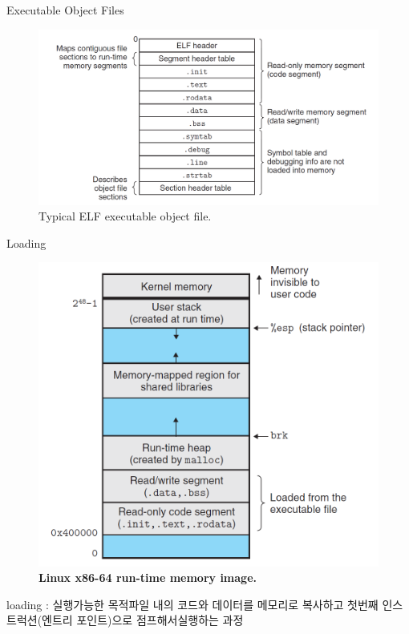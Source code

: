 \documentclass[10pt]{beamer}
\begin{document}
\begin{frame}{Executable Object Files}
    \begin{figure}[h!]
        \centering
        \includegraphics[scale=0.24]{pic/pic3.PNG}
        \caption{Typical ELF executable object file.}
    \end{figure}
\end{frame}    

\begin{frame}{Loading}    
    \begin{figure}[h!]
        \centering
        \includegraphics[scale=0.3]{pic/pic4.PNG}
        \caption{\textbf{Linux x86-64 run-time memory image.}}
    \end{figure}
    loading : 실행가능한 목적파일 내의 코드와 데이터를 메모리로 복사하고 첫번째 인스트럭션(엔트리 포인트)으로 점프해서실행하는 과정
\end{frame}    
\end{document}

